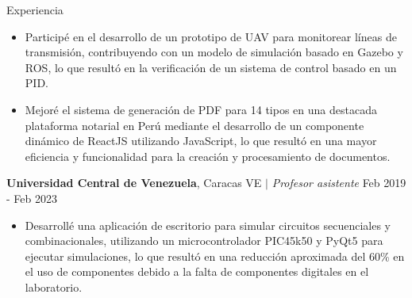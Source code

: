 \documentclass{resume} %
\begin{document}
\begin{rSection}{Experiencia}
\begin{itemize}
    \item Participé en el desarrollo de un prototipo de UAV para monitorear líneas de transmisión, contribuyendo con un modelo de simulación basado en Gazebo y ROS, lo que resultó en la verificación de un sistema de control basado en un PID.
    
    \item Mejoré el sistema de generación de PDF para 14 tipos en una destacada plataforma notarial en Perú mediante el desarrollo de un componente dinámico de ReactJS utilizando JavaScript, lo que resultó en una mayor eficiencia y funcionalidad para la creación y procesamiento de documentos.
\end{itemize}


    

\textbf{Universidad Central de Venezuela}, Caracas VE $\mid$ \textit{Profesor asistente} \hfill Feb 2019 - Feb 2023   

\begin{itemize}
    \item Desarrollé una aplicación de escritorio para simular circuitos secuenciales y combinacionales, utilizando un microcontrolador PIC45k50 y PyQt5 para ejecutar simulaciones, lo que resultó en una reducción aproximada del 60\% en el uso de componentes debido a la falta de componentes digitales en el laboratorio.
    

\end{itemize}
\end{rSection}
\end{document}
